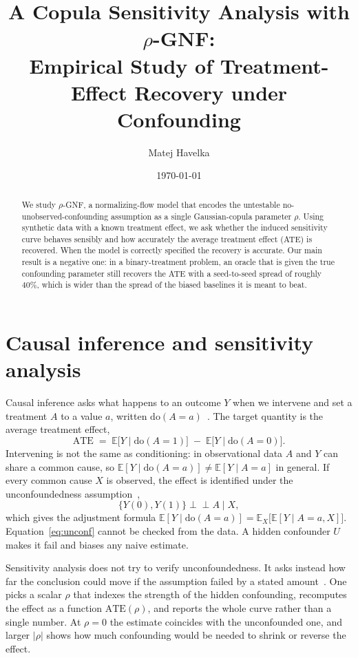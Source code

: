 \documentclass[11pt]{article}
\title{\vspace{-2.5em}A Copula Sensitivity Analysis with $\rho$-GNF:\\
Empirical Study of Treatment-Effect Recovery under Confounding}
\author{Matej Havelka}
\date{\today}
\newcommand{\rgnf}{$\rho$-GNF}
\newcommand{\doop}{\mathrm{do}}
\newcommand{\E}{\mathbb{E}}
\begin{document}
\maketitle
\vspace{-2em}

\begin{abstract}
\noindent
We study \rgnf{}, a normalizing-flow model that encodes the untestable
no-unobserved-confounding assumption as a single Gaussian-copula parameter $\rho$.
Using synthetic data with a known treatment effect, we ask whether the induced
sensitivity curve behaves sensibly and how accurately the average treatment effect
(ATE) is recovered. When the model is correctly specified the recovery is accurate.
Our main result is a negative one: in a binary-treatment problem, an oracle that is
given the true confounding parameter still recovers the ATE with a seed-to-seed
spread of roughly $40\%$, which is wider than the spread of the biased baselines it
is meant to beat.
\end{abstract}

\section{Causal inference and sensitivity analysis}

Causal inference asks what happens to an outcome $Y$ when we intervene and set a
treatment $A$ to a value $a$, written $\doop(A=a)$~\cite{pearl2009causality}. The
target quantity is the average treatment effect,
\begin{equation}
  \mathrm{ATE} \;=\; \E\!\big[Y \mid \doop(A=1)\big] \;-\; \E\!\big[Y \mid \doop(A=0)\big].
  \label{eq:ate}
\end{equation}
Intervening is not the same as conditioning: in observational data $A$ and $Y$ can
share a common cause, so $\E[Y\mid \doop(A=a)]\neq\E[Y\mid A=a]$ in general. If
every common cause $X$ is observed, the effect is identified under the
unconfoundedness assumption~\cite{imbens2015causal},
\begin{equation}
  \{Y(0),Y(1)\} \perp\!\!\!\perp A \mid X,
  \label{eq:unconf}
\end{equation}
which gives the adjustment formula $\E[Y\mid\doop(A=a)] = \E_X\big[\E[Y\mid A=a, X]\big]$.
Equation~\eqref{eq:unconf} cannot be checked from the data. A hidden confounder $U$
makes it fail and biases any naive estimate.

Sensitivity analysis does not try to verify unconfoundedness. It asks instead how
far the conclusion could move if the assumption failed by a stated
amount~\cite{rosenbaum1983sensitivity}. One picks a scalar $\rho$ that indexes the
strength of the hidden confounding, recomputes the effect as a function
$\mathrm{ATE}(\rho)$, and reports the whole curve rather than a single number. At
$\rho=0$ the estimate coincides with the unconfounded one, and larger $|\rho|$
shows how much confounding would be needed to shrink or reverse the effect.
\end{document}
